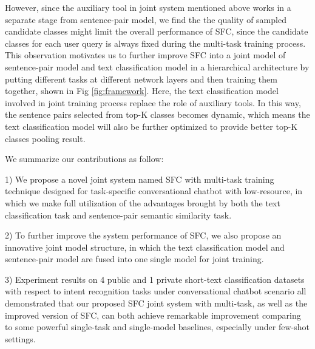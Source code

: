 \documentclass[letterpaper]{article} %
\begin{document}
  However,  since  the auxiliary tool in joint system mentioned above works in a
  separate  stage  from  sentence-pair model, we find the the quality of sampled
  candidate  classes  might  limit  the  overall  performance  of SFC, since the
  candidate  classes  for  each user query is always fixed during the multi-task
  training  process. This observation motivates us to further improve SFC into a
  joint  model  of  sentence-pair  model  and  text  classification  model  in a
  hierarchical  architecture  by  putting  different  tasks at different network
  layers \cite{sogaard2016deep,   hashimoto2016joint}   and  then  training  them
  together,  shown  in  Fig  \ref{fig:framework}.  Here, the text classification
  model  involved in joint training process replace the role of auxiliary tools.
  In  this  way, the sentence pairs selected from top-K classes becomes dynamic,
  which  means  the  text classification model will also be further optimized to
  provide better top-K classes pooling result.

  We summarize our contributions as follow:

  1)  We  propose  a  novel  joint  system  named  SFC  with multi-task training
  technique designed for task-specific conversational chatbot with low-resource,
  in  which  we make full utilization of the advantages brought by both the text
  classification task and sentence-pair semantic similarity task.

  2)  To  further  improve  the  system  performance  of SFC, we also propose an
  innovative  joint  model structure, in which the text classification model and
  sentence-pair model are fused into one single model for joint training.

  3)  Experiment  results  on  4  public and 1 private short-text classification
  datasets with respect to intent recognition tasks under conversational chatbot
  scenario  all demonstrated that our proposed SFC joint system with multi-task,
  as  well  as  the  improved  version  of  SFC,  can  both  achieve  remarkable
  improvement comparing to some powerful single-task and single-model baselines,
  especially under few-shot settings.
\end{document}
